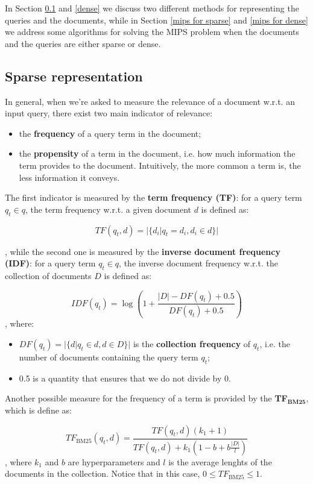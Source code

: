 In Section \ref{sparse} and \ref{dense} we discuss two different methods for representing the queries and the documents, while in Section \ref{mips for sparse} and \ref{mips for dense} we address some algorithms for solving the MIPS problem when the documents and the queries are either sparse or dense.

\subsection{Sparse representation}\label{sparse}
In general, when we're asked to measure the relevance of a document w.r.t. an input query, there exist two main indicator of relevance:

\begin{itemize}
    \item the \textbf{frequency} of a query term in the document;
    \item the \textbf{propensity} of a term in the document, i.e. how much information the term provides to the document. Intuitively, the more common a term is, the less information it conveys.
\end{itemize}

The first indicator is measured by the \textbf{term frequency (TF)}: for a query term $q_t \in q$, the term frequency w.r.t. a given document $d$ is defined as:

$$
TF(q_t, d) = |\{ d_i | q_t = d_i, d_i \in d \}|
$$

, while the second one is measured by the \textbf{inverse document frequency (IDF)}: for a query term $q_t \in q$, the inverse document frequency w.r.t. the collection of documents $D$ is defined as:

$$
IDF(q_t) = \log (1 + \frac{|D| - DF(q_t) + 0.5}{DF(q_t) + 0.5})
$$
, where:

\begin{itemize}
    \item $DF(q_t) = |\{ d | q_t \in d, d \in D \}|$ is the \textbf{collection frequency} of $q_t$, i.e. the number of documents containing the query term $q_t$;
    \item 0.5 is a quantity that ensures that we do not divide by 0.
\end{itemize}

Another possible measure for the frequency of a term is provided by the \textbf{TF$_{\textbf{BM25}}$}, which is define as:

$$
TF_{\text{BM25}}(q_t,d) = \frac{TF(q_t,d)  (k_1 + 1)}{TF(q_t,d) + k_1 (1 - b + b \frac{|D|}{l})}
$$
, where $k_1$ and $b$ are hyperparameters and $l$ is the average lenghts of the documents in the collection. Notice that in this case, $0 \leq TF_{\text{BM25}} \leq 1$.


